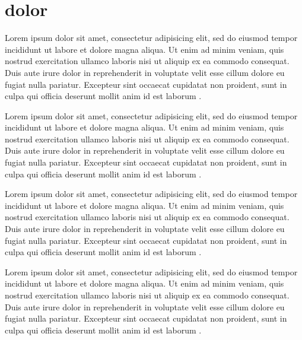 \section{dolor}

Lorem ipsum dolor sit amet, consectetur adipisicing elit, sed do eiusmod tempor incididunt ut
labore et dolore magna aliqua. Ut enim ad minim veniam, quis nostrud exercitation ullamco
laboris nisi ut aliquip ex ea commodo consequat. Duis aute irure dolor in reprehenderit in
voluptate velit esse cillum dolore eu fugiat nulla pariatur. Excepteur sint occaecat cupidatat
non proident, sunt in culpa qui officia deserunt mollit anim id est laborum \cite{freeman2004}.

Lorem ipsum dolor sit amet, consectetur adipisicing elit, sed do eiusmod tempor incididunt ut
labore et dolore magna aliqua. Ut enim ad minim veniam, quis nostrud exercitation ullamco
laboris nisi ut aliquip ex ea commodo consequat. Duis aute irure dolor in reprehenderit in
voluptate velit esse cillum dolore eu fugiat nulla pariatur. Excepteur sint occaecat cupidatat
non proident, sunt in culpa qui officia deserunt mollit anim id est laborum \cite{freeman2004}.

Lorem ipsum dolor sit amet, consectetur adipisicing elit, sed do eiusmod tempor incididunt ut
labore et dolore magna aliqua. Ut enim ad minim veniam, quis nostrud exercitation ullamco
laboris nisi ut aliquip ex ea commodo consequat. Duis aute irure dolor in reprehenderit in
voluptate velit esse cillum dolore eu fugiat nulla pariatur. Excepteur sint occaecat cupidatat
non proident, sunt in culpa qui officia deserunt mollit anim id est laborum \cite{freeman2004}.

Lorem ipsum dolor sit amet, consectetur adipisicing elit, sed do eiusmod tempor incididunt ut
labore et dolore magna aliqua. Ut enim ad minim veniam, quis nostrud exercitation ullamco
laboris nisi ut aliquip ex ea commodo consequat. Duis aute irure dolor in reprehenderit in
voluptate velit esse cillum dolore eu fugiat nulla pariatur. Excepteur sint occaecat cupidatat
non proident, sunt in culpa qui officia deserunt mollit anim id est laborum \cite{freeman2004}.


